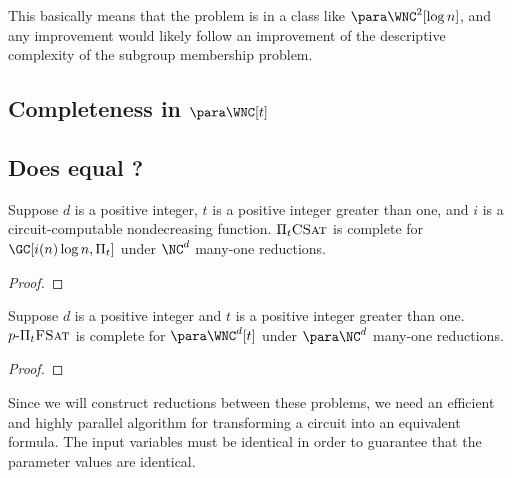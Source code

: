 This basically means that the problem is in a class like $\para \WNC^2[\log n]$, and any improvement would likely follow an improvement of the descriptive complexity of the subgroup membership problem.

\subsection{Completeness in \texorpdfstring{$\para \WNC[t]$}{paraWNC[t]}}


\subsection{Does \texorpdfstring{\para \NC}{paraNC} equal \texorpdfstring{\para \WNC[t]}{paraWNC[t]}?}

\begin{theorem}\label{thm:picsatgc}
  Suppose $d$ is a positive integer, $t$ is a positive integer greater than one, and $i$ is a circuit-computable nondecreasing function.
  $\Pi_t \textsc{CSat}$ is complete for $\GC[i(n) \log n, \Pi_t]$ under $\NC^d$ many-one reductions.
\end{theorem}
\begin{proof}
\end{proof}

\begin{theorem}\label{thm:ppifsat}
  Suppose $d$ is a positive integer and $t$ is a positive integer greater than one.
  $p \textnormal{-} \Pi_t \textsc{FSat}$ is complete for $\para \WNC^d[t]$ under $\para \NC^d$ many-one reductions.
\end{theorem}
\begin{proof}
\end{proof}

Since we will construct reductions between these problems, we need an efficient and highly parallel algorithm for transforming a circuit into an equivalent formula.
The input variables must be identical in order to guarantee that the parameter values are identical.

